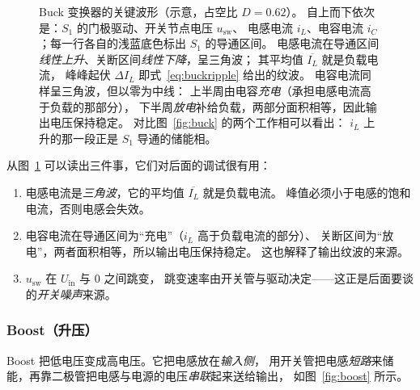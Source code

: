 \documentclass[cn,blue,11pt,device=normal]{elegantnote}
\begin{document}
\begin{figure}[htbp]
  \caption{Buck 变换器的关键波形（示意，占空比 $D=0.62$）。
  自上而下依次是：$S_1$ 的门极驱动、开关节点电压 $u_{\mathrm{sw}}$、
  电感电流 $i_L$、电容电流 $i_C$；每一行各自的浅蓝底色标出 $S_1$ 的导通区间。
  电感电流在导通区间\emph{线性上升}、关断区间\emph{线性下降}，呈三角波；
  其平均值 $\overline{I_L}$ 就是负载电流，
  峰峰起伏 $\Delta I_L$ 即式~\eqref{eq:buckripple} 给出的纹波。
  电容电流同样呈三角波，但以零为中线：
  上半周由电容\emph{充电}（承担电感电流高于负载的那部分），
  下半周\emph{放电}补给负载，两部分面积相等，因此输出电压保持稳定。
  对比图~\ref{fig:buck} 的两个工作相可以看出：
  $i_L$ 上升的那一段正是 $S_1$ 导通的储能相。}
  \label{fig:buckwave}
\end{figure}

从图~\ref{fig:buckwave} 可以读出三件事，它们对后面的调试很有用：

\begin{enumerate}
  \item 电感电流是\emph{三角波}，它的平均值 $\overline{I_L}$ 就是负载电流。
  峰值必须小于电感的饱和电流，否则电感会失效。
  \item 电容电流在导通区间为“充电”（$i_L$ 高于负载电流的部分）、
  关断区间为“放电”，两者面积相等，所以输出电压保持稳定。
  这也解释了输出纹波的来源。
  \item $u_{\mathrm{sw}}$ 在 $U_{\mathrm{in}}$ 与 $0$ 之间跳变，
  跳变速率由开关管与驱动决定——这正是后面要谈的\emph{开关噪声}来源。
\end{enumerate}

\subsubsection{Boost（升压）}

Boost 把低电压变成高电压。它把电感放在\emph{输入侧}，
用开关管把电感\emph{短路}来储能，再靠二极管把电感与电源的电压\emph{串联}起来送给输出，
如图~\ref{fig:boost} 所示。
\end{document}
